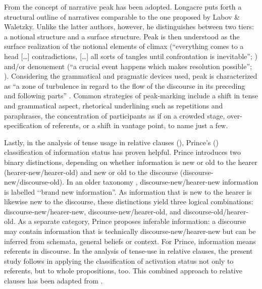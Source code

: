 From \citet{LongacreR1996} the concept of narrative peak has been adopted. Longacre puts forth a structural outline of narratives comparable to the one proposed by Labov \& Waletzky. Unlike the latter authors, however, he distinguishes between two tiers: a notional structure and a surface structure. Peak is then understood as the surface realization of the notional elements of climax (``everything comes to a head […] contradictions, […] all sorts of tangles until confrontation is inevitable''; \citealt[35]{LongacreR1996}) and/or denouement (``a crucial event happens which makes resolution possible''; \citealt[35]{LongacreR1996}). Considering the grammatical and pragmatic devices used, peak is characterized as ``a zone of turbulence in regard to the flow of the discourse in its preceding and following parts'' \citep[38]{LongacreR1996}. Common strategies of peak-marking include a shift in tense and grammatical aspect, rhetorical underlining such as repetitions and paraphrases, the concentration of participants as if on a crowded stage, over-specification of referents, or a shift in vantage point, to name just a few.

Lastly, in the analysis of tense usage in relative clauses (), Prince's (\citeyear{PrinceEF1992}) classification of information status has proven helpful. Prince introduces two binary distinctions, depending on whether information is new or old to the hearer (hearer-new/hearer-old) and new or old to the discourse (discourse-new/discourse-old). In an older taxonomy \citep{PrinceEF1981}, discourse-new/hearer-new information is labelled \lq\lq brand new information''. As information that is new to the hearer is likewise new to the discourse, these distinctions yield three logical combinations: discourse-new/hearer-new, discourse-new/hearer-old, and discourse-old/hearer-old. As a separate category, Prince proposes inferable information: a discourse may contain information that is technically discourse-new/hearer-new but can be inferred from schemata, general beliefs or context. For Prince, information means referents in discourse. In the analysis of tense-use in relative clauses, the present study follows \citet{LevinsohnH2007} in applying the classification of activation status not only to referents, but to whole propositions, too. This combined approach to relative clauses has been adapted from \citet{KarelsJ2014}.  